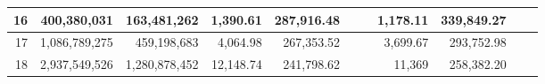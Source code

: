 \documentclass[conference]{IEEEtran}
\newcommand{\matr}[1]{\mathbf{#1}} %
\begin{document}
\begin{table*}[tb]
\begin{threeparttable}[c]
\begin{tabular}{r|rr|rr|rr|rr|rr}
\hline                                                                                                                    
16 & 400,380,031 & 163,481,262 & 1,390.61 & 287,916.48 &  &  & 1,178.11 & 339,849.27 &  &  \\                             
\hline                                                                                                                    
17 & 1,086,789,275 & 459,198,683 & 4,064.98 & 267,353.52 &  &  & 3,699.67 & 293,752.98 &  &  \\                           
\hline                                                                                                                    
18 & 2,937,549,526 & 1,280,878,452 & 12,148.74 & 241,798.62 &  &  & 11,369 & 258,382.20 &  &  \\
\end{tabular}
\end{threeparttable}
\vspace{-1em}
\end{table*}






%
%
\end{document}
